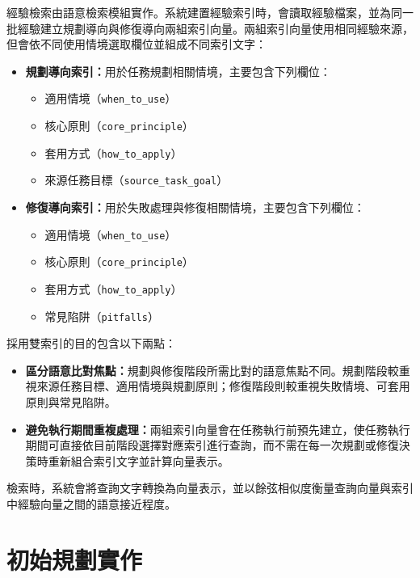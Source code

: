 \begin{ZhChapter}
經驗檢索由語意檢索模組實作。系統建置經驗索引時，會讀取經驗檔案，並為同一批經驗建立規劃導向與修復導向兩組索引向量。兩組索引向量使用相同經驗來源，但會依不同使用情境選取欄位並組成不同索引文字：

\begin{itemize}
    \item \textbf{規劃導向索引：}用於任務規劃相關情境，主要包含下列欄位：
    \begin{itemize}
        \item 適用情境（\texttt{when\_to\_use}）
        \item 核心原則（\texttt{core\_principle}）
        \item 套用方式（\texttt{how\_to\_apply}）
        \item 來源任務目標（\texttt{source\_task\_goal}）
    \end{itemize}
    \item \textbf{修復導向索引：}用於失敗處理與修復相關情境，主要包含下列欄位：
    \begin{itemize}
        \item 適用情境（\texttt{when\_to\_use}）
        \item 核心原則（\texttt{core\_principle}）
        \item 套用方式（\texttt{how\_to\_apply}）
        \item 常見陷阱（\texttt{pitfalls}）
    \end{itemize}
\end{itemize}

採用雙索引的目的包含以下兩點：

\begin{itemize}
    \item \textbf{區分語意比對焦點：}規劃與修復階段所需比對的語意焦點不同。規劃階段較重視來源任務目標、適用情境與規劃原則；修復階段則較重視失敗情境、可套用原則與常見陷阱。
    \item \textbf{避免執行期間重複處理：}兩組索引向量會在任務執行前預先建立，使任務執行期間可直接依目前階段選擇對應索引進行查詢，而不需在每一次規劃或修復決策時重新組合索引文字並計算向量表示。
\end{itemize}

檢索時，系統會將查詢文字轉換為向量表示，並以餘弦相似度衡量查詢向量與索引中經驗向量之間的語意接近程度。

\section{初始規劃實作}


\end{ZhChapter}
